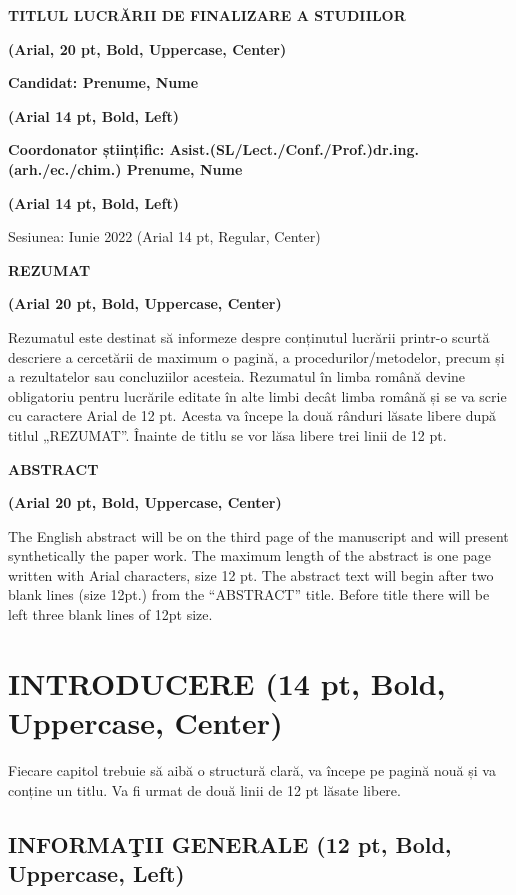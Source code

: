 \documentclass[
]{article}
\author{}
\date{}
\begin{document}
\textbf{TITLUL LUCRĂRII DE FINALIZARE A STUDIILOR}

\textbf{(Arial, 20 pt, Bold, Uppercase, Center)}

\textbf{Candidat: Prenume, Nume}

\textbf{(Arial 14 pt, Bold, Left)}

\textbf{Coordonator științific:
Asist.(SL/Lect./Conf./Prof.)dr.ing.(arh./ec./chim.) Prenume, Nume}

\textbf{(Arial 14 pt, Bold, Left)}

Sesiunea: Iunie 2022 (Arial 14 pt, Regular, Center)

\textbf{REZUMAT}

\textbf{(Arial 20 pt, Bold, Uppercase, Center)}

Rezumatul este destinat să informeze despre conținutul lucrării printr-o
scurtă descriere a cercetării de maximum o pagină, a
procedurilor/metodelor, precum și a rezultatelor sau concluziilor
acesteia. Rezumatul în limba română devine obligatoriu pentru lucrările
editate în alte limbi decât limba română și se va scrie cu caractere
Arial de 12 pt. Acesta va începe la două rânduri lăsate libere după
titlul „REZUMAT''. Înainte de titlu se vor lăsa libere trei linii de 12
pt.

\textbf{ABSTRACT}

\textbf{(Arial 20 pt, Bold, Uppercase, Center)}

The English abstract will be on the third page of the manuscript and
will present synthetically the paper work. The maximum length of the
abstract is one page written with Arial characters, size 12 pt. The
abstract text will begin after two blank lines (size 12pt.) from the
``ABSTRACT'' title. Before title there will be left three blank lines of
12pt size.

\hypertarget{introducere-14-pt-bold-uppercase-center}{%
\section{\texorpdfstring{\hfill\break
INTRODUCERE (14 pt, Bold, Uppercase,
Center)}{ INTRODUCERE (14 pt, Bold, Uppercase, Center)}}\label{introducere-14-pt-bold-uppercase-center}}

Fiecare capitol trebuie să aibă o structură clară, va începe pe pagină
nouă și va conține un titlu. Va fi urmat de două linii de 12 pt lăsate
libere.

\hypertarget{informaux163ii-generale-12-pt-bold-uppercase-left}{%
\subsection{INFORMAŢII GENERALE (12 pt, Bold, Uppercase,
Left)}\label{informaux163ii-generale-12-pt-bold-uppercase-left}}
\end{document}
